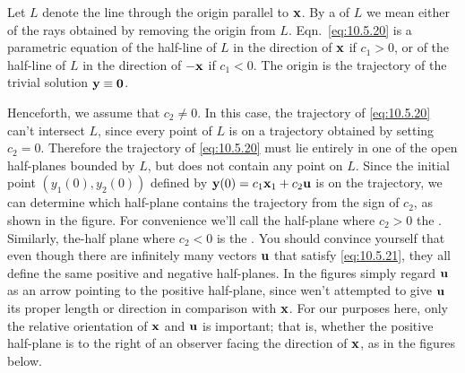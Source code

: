 \documentclass{ximera}
\begin{document}


Let $L$ denote the line through the origin parallel to ${\bf x}$. By a
 of $L$ we mean either of the rays obtained by
removing the origin from $L$. Eqn.~\eqref{eq:10.5.20} is a parametric
equation of the half-line of $L$ in the direction of ${\bf x}$ if
$c_1>0$, or of the half-line of $L$ in the direction of $-{\bf x}$ if
$c_1<0$. The origin is the trajectory of the trivial solution ${\bf
y}\equiv{\bf 0}$.

Henceforth, we assume that $c_2\neq0$. In this case, the trajectory of
\eqref{eq:10.5.20} can't intersect $L$, since every point of $L$ is on a
trajectory obtained by setting $c_2=0$. Therefore the trajectory of
\eqref{eq:10.5.20} must lie entirely in one of the open half-planes
bounded
by $L$, but does not contain any point on $L$. Since the initial point
$(y_1(0),y_2(0))$ defined by ${\bf y}(0)=c_1{\bf x}_1+c_2{\bf u}$ is
on the trajectory, we can determine which half-plane contains the
trajectory from the sign of $c_2$, as shown in
the figure.
For convenience we'll call the half-plane where $c_2>0$ the
. Similarly, the-half plane where $c_2<0$ is
the . You should convince yourself %
that even though there are infinitely
many vectors ${\bf u}$ that satisfy \eqref{eq:10.5.21}, they all define
the same positive and negative half-planes. In the figures simply
regard ${\bf u}$ as an arrow pointing to the positive half-plane,
since wen't attempted to give ${\bf u}$ its proper length or
direction in comparison with ${\bf x}$. For our purposes here, only the
relative orientation of ${\bf x}$ and ${\bf u}$ is important; that is,
whether the positive half-plane is to the right of an observer facing
the direction of ${\bf x}$, as in the figures below.

\begin{center}
\end{center}

\begin{center}
\end{center}

\end{document}
